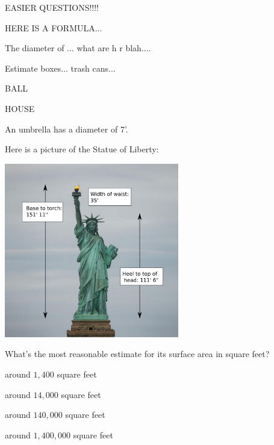 \documentclass{ximera}
\author{Bart Snapp}
\begin{document}
\maketitle



EASIER QUESTIONS!!!!



HERE IS A FORMULA...

The diameter of ... what are h r blah....


Estimate boxes... trash cans... 

\begin{exercise}
BALL
\end{exercise}
\vfill

\begin{exercise}
 HOUSE
\end{exercise}
\vfill


\begin{exercise}
  An umbrella has a diameter of $7$'. 
\end{exercise}
\vfill


\begin{exercise}
  Here is a picture of the Statue of Liberty:
  \begin{center}
    \includegraphics[width=3in]{statueLiberty.png}
  \end{center}
  What's the most reasonable estimate for its surface area in square feet?
  \begin{enumerate}\begin{multicols}{2}
    \item around $1,400$ square feet
    \item around $14,000$ square feet
    \item around $140,000$ square feet
    \item around $1,400,000$ square feet
    \end{multicols}
  \end{enumerate}
\end{exercise}
\end{document}
